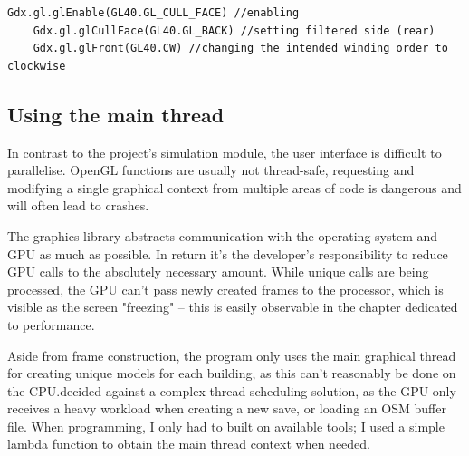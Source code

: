 \begin{lstlisting}[caption=Example for changing OpenGL's culling properties through libGDX]
    Gdx.gl.glEnable(GL40.GL_CULL_FACE) //enabling
    Gdx.gl.glCullFace(GL40.GL_BACK) //setting filtered side (rear)
    Gdx.gl.glFront(GL40.CW) //changing the intended winding order to clockwise
\end{lstlisting}

\subsection{Using the main thread}

In contrast to the project's simulation module, the user interface is difficult to parallelise. OpenGL functions are usually not thread-safe, requesting and modifying a single graphical context from multiple areas of code is dangerous and will often lead to crashes.


The graphics library abstracts communication with the operating system and GPU as much as possible. In return it's the developer's responsibility to reduce GPU calls to the absolutely necessary amount. While unique calls are being processed, the GPU can't pass newly created frames to the processor, which is visible as the screen "freezing" -- this is easily observable in the chapter dedicated to performance. 


Aside from frame construction, the program only uses the main graphical thread for creating unique models for each building, as this can't reasonably be done on the CPU.\@I decided against a complex thread-scheduling solution, as the GPU  only receives a heavy workload when creating a new save, or loading an OSM buffer file. When programming, I only had to built on available tools; I used a simple lambda function to obtain the main thread context when needed.

